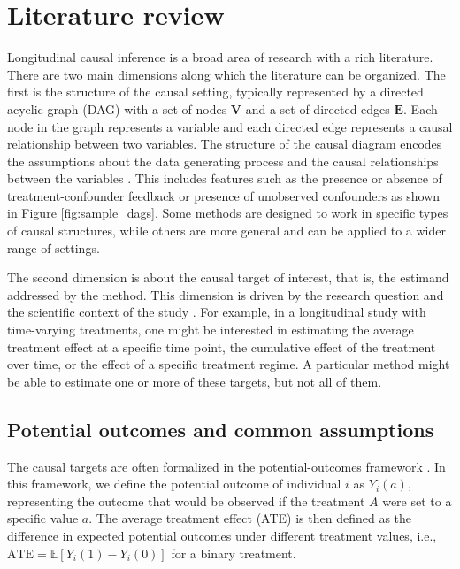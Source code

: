\chapter{Literature review}
\label{chap:literature_review}

Longitudinal causal inference is a broad area of research with a rich literature. There are 
two main dimensions along which the literature can be organized. The first is the structure 
of the causal setting, typically represented by a directed acyclic graph (DAG) 
with a set of nodes $\mathbf{V}$ and a set of directed edges $\mathbf{E}$. 
Each node in the graph represents a variable and each directed edge 
represents a causal relationship between two variables. 
The structure of the causal diagram encodes the assumptions about the 
data generating process and the causal relationships between the variables \cite{pearlCausalityModelsReasoning2009}. This includes 
features such as the presence or absence of treatment-confounder feedback or presence 
of unobserved confounders as shown in Figure \ref{fig:sample_dags}. Some methods are designed to work in specific types 
of causal structures, while others are more general and can be applied to a wider range of settings.

The second dimension is about the causal target of interest, that is, the 
estimand addressed by the method. This dimension is driven by the research question and 
the scientific context of the study \cite{lundbergWhatYourEstimand2021}. 
For example, in a longitudinal study with time-varying treatments, 
one might be interested in estimating the average treatment effect at a specific time point, 
the cumulative effect of the treatment over time, or the effect of a specific treatment regime. A particular method 
might be able to estimate one or more of these targets, but not all of them.

\section{Potential outcomes and common assumptions}
The causal targets are often formalized in the potential-outcomes framework \cite{rubinEstimatingCausalEffects1974}. 
In this framework, we define the potential outcome of individual $i$ as $Y_i(a)$, representing the outcome that would be observed if 
the treatment $A$ were set to a specific value $a$. The average treatment effect (ATE) is then defined as 
the difference in expected potential outcomes under different treatment values, i.e., $\text{ATE} = \mathbb{E}[Y_i(1) - Y_i(0)]$ 
for a binary treatment.

